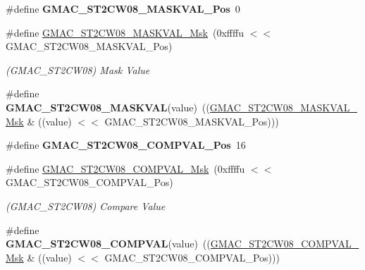 \begin{DoxyCompactItemize}
\#define {\bfseries G\+M\+A\+C\+\_\+\+S\+T2\+C\+W08\+\_\+\+M\+A\+S\+K\+V\+A\+L\+\_\+\+Pos}~0
\item 
\mbox{\label{group__SAME70__GMAC_gaafeb6de879cef9024cb00fabec585d7d}} 
\#define \mbox{\hyperlink{group__SAME70__GMAC_gaafeb6de879cef9024cb00fabec585d7d}{G\+M\+A\+C\+\_\+\+S\+T2\+C\+W08\+\_\+\+M\+A\+S\+K\+V\+A\+L\+\_\+\+Msk}}~(0xffffu $<$$<$ G\+M\+A\+C\+\_\+\+S\+T2\+C\+W08\+\_\+\+M\+A\+S\+K\+V\+A\+L\+\_\+\+Pos)
\begin{DoxyCompactList}\small\item\em (G\+M\+A\+C\+\_\+\+S\+T2\+C\+W08) Mask Value \end{DoxyCompactList}\item 
\mbox{\label{group__SAME70__GMAC_ga08decedd03090aa8585d015708819f2d}} 
\#define {\bfseries G\+M\+A\+C\+\_\+\+S\+T2\+C\+W08\+\_\+\+M\+A\+S\+K\+V\+AL}(value)~((\mbox{\hyperlink{group__SAMV71__GMAC_gaafeb6de879cef9024cb00fabec585d7d}{G\+M\+A\+C\+\_\+\+S\+T2\+C\+W08\+\_\+\+M\+A\+S\+K\+V\+A\+L\+\_\+\+Msk}} \& ((value) $<$$<$ G\+M\+A\+C\+\_\+\+S\+T2\+C\+W08\+\_\+\+M\+A\+S\+K\+V\+A\+L\+\_\+\+Pos)))
\item 
\mbox{\label{group__SAME70__GMAC_ga90fe97c6545f8b1a9f3fbed95bce292f}} 
\#define {\bfseries G\+M\+A\+C\+\_\+\+S\+T2\+C\+W08\+\_\+\+C\+O\+M\+P\+V\+A\+L\+\_\+\+Pos}~16
\item 
\mbox{\label{group__SAME70__GMAC_ga92addb2e9a0d41895f1dab123e6c070f}} 
\#define \mbox{\hyperlink{group__SAME70__GMAC_ga92addb2e9a0d41895f1dab123e6c070f}{G\+M\+A\+C\+\_\+\+S\+T2\+C\+W08\+\_\+\+C\+O\+M\+P\+V\+A\+L\+\_\+\+Msk}}~(0xffffu $<$$<$ G\+M\+A\+C\+\_\+\+S\+T2\+C\+W08\+\_\+\+C\+O\+M\+P\+V\+A\+L\+\_\+\+Pos)
\begin{DoxyCompactList}\small\item\em (G\+M\+A\+C\+\_\+\+S\+T2\+C\+W08) Compare Value \end{DoxyCompactList}\item 
\mbox{\label{group__SAME70__GMAC_gac7bb22be90e2083ae50791c02558d14b}} 
\#define {\bfseries G\+M\+A\+C\+\_\+\+S\+T2\+C\+W08\+\_\+\+C\+O\+M\+P\+V\+AL}(value)~((\mbox{\hyperlink{group__SAMV71__GMAC_ga92addb2e9a0d41895f1dab123e6c070f}{G\+M\+A\+C\+\_\+\+S\+T2\+C\+W08\+\_\+\+C\+O\+M\+P\+V\+A\+L\+\_\+\+Msk}} \& ((value) $<$$<$ G\+M\+A\+C\+\_\+\+S\+T2\+C\+W08\+\_\+\+C\+O\+M\+P\+V\+A\+L\+\_\+\+Pos)))

\end{DoxyCompactItemize}
